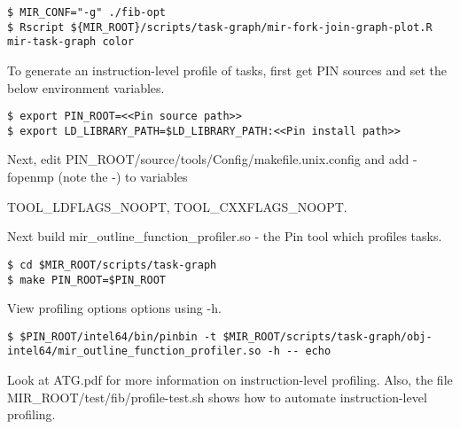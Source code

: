 \documentclass[11pt,a4paper,notitlepage]{article}
\begin{document}
\begin{lstlisting}[style=BashInputStyle]
$ MIR_CONF="-g" ./fib-opt
$ Rscript ${MIR_ROOT}/scripts/task-graph/mir-fork-join-graph-plot.R mir-task-graph color
\end{lstlisting}

To generate an instruction-level profile of tasks, first get PIN sources and set the below environment variables.
\begin{lstlisting}[style=BashInputStyle]
$ export PIN_ROOT=<<Pin source path>>
$ export LD_LIBRARY_PATH=$LD_LIBRARY_PATH:<<Pin install path>>
\end{lstlisting}

Next, edit PIN\_ROOT/source/tools/Config/makefile.unix.config and add -fopenmp (note the -) to variables 
\begin{tiny}{TOOL\_LDFLAGS\_NOOPT, TOOL\_CXXFLAGS\_NOOPT}.\end{tiny}

Next build mir\_outline\_function\_profiler.so - the Pin tool which profiles tasks.
\begin{lstlisting}[style=BashInputStyle]
$ cd $MIR_ROOT/scripts/task-graph
$ make PIN_ROOT=$PIN_ROOT
\end{lstlisting}

View profiling options options using -h.
\begin{lstlisting}[style=BashInputStyle]
$ $PIN_ROOT/intel64/bin/pinbin -t $MIR_ROOT/scripts/task-graph/obj-intel64/mir_outline_function_profiler.so -h -- echo
\end{lstlisting}

Look at ATG.pdf for more information on instruction-level profiling.
Also, the file MIR\_ROOT/test/fib/profile-test.sh shows how to automate instruction-level profiling.
\end{document}
